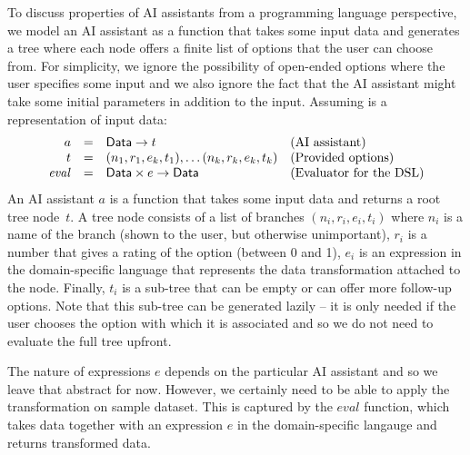 \documentclass{article}
\begin{document}
To discuss properties of AI assistants from a programming language perspective, we model an AI 
assistant as a function that takes some input data and generates a tree where each node offers a 
finite list of options that the user can choose from. For simplicity, we ignore the possibility of 
open-ended options where the user specifies some input and we also ignore the fact that the AI 
assistant might take some initial parameters in addition to the input. Assuming 
is a representation of input data:
%
\begin{equation*}
\begin{array}{rcll}
a &=& \textnormal{\sffamily Data} \rightarrow t &\textnormal{(AI assistant)}\\
t &=& (n_1, r_1, e_k, t_1), \ldots (n_k, r_k, e_k, t_k) &\textnormal{(Provided options)}\\
\mathit{eval} &=& \textnormal{\sffamily Data}\times e \rightarrow \textnormal{\sffamily Data}&\textnormal{(Evaluator for the DSL)}
\end{array}
\end{equation*}
%
An AI assistant $a$ is a function that takes some input data and returns a root tree node~$t$. 
A tree node consists of a list of branches $(n_i, r_i, e_i, t_i)$ where $n_i$ is a name of the branch 
(shown to the user, but otherwise unimportant), $r_i$ is a number that gives a rating of the option
(between 0 and 1), $e_i$ is an expression in the domain-specific language that represents
the data transformation attached to the node. Finally, $t_i$ is a sub-tree that can be empty or can 
offer more follow-up options. Note that this sub-tree can be generated lazily -- it is only needed 
if the user chooses the option with which it is associated and so we do not need to evaluate the 
full tree upfront.

The nature of expressions $e$ depends on the particular AI assistant and so we leave that abstract
for now. However, we certainly need to be able to apply the transformation on sample dataset. 
This is captured by the $\mathit{eval}$ function, which takes data together with an expression $e$
in the domain-specific langauge and returns transformed data. 

\newpage
\end{document}
